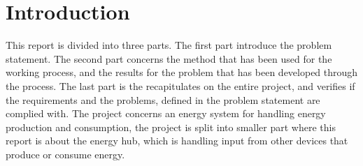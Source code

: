 \chapter{Introduction}
This report is divided into three parts. The first part introduce the problem statement. The second part concerns the method that has been used for the working process, and the results for the problem that has been developed through the process. The last part is the recapitulates on the entire project, and verifies if the requirements and the problems, defined in the problem statement are complied with.
The project concerns an energy system for handling energy production and consumption, the project is split into smaller part where this report is about the energy hub, which is handling input from other devices that produce or consume energy.
